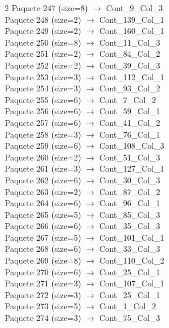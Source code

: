 \begin{multicols}{2}
Paquete 247 (size=8) $\rightarrow$ Cont\_9\_Col\_3\\
Paquete 248 (size=2) $\rightarrow$ Cont\_139\_Col\_1\\
Paquete 249 (size=2) $\rightarrow$ Cont\_160\_Col\_1\\
Paquete 250 (size=8) $\rightarrow$ Cont\_11\_Col\_3\\
Paquete 251 (size=2) $\rightarrow$ Cont\_84\_Col\_2\\
Paquete 252 (size=2) $\rightarrow$ Cont\_39\_Col\_3\\
Paquete 253 (size=3) $\rightarrow$ Cont\_112\_Col\_1\\
Paquete 254 (size=3) $\rightarrow$ Cont\_93\_Col\_2\\
Paquete 255 (size=6) $\rightarrow$ Cont\_7\_Col\_2\\
Paquete 256 (size=6) $\rightarrow$ Cont\_59\_Col\_1\\
Paquete 257 (size=6) $\rightarrow$ Cont\_41\_Col\_2\\
Paquete 258 (size=3) $\rightarrow$ Cont\_76\_Col\_1\\
Paquete 259 (size=6) $\rightarrow$ Cont\_108\_Col\_3\\
Paquete 260 (size=2) $\rightarrow$ Cont\_51\_Col\_3\\
Paquete 261 (size=3) $\rightarrow$ Cont\_127\_Col\_1\\
Paquete 262 (size=6) $\rightarrow$ Cont\_30\_Col\_3\\
Paquete 263 (size=2) $\rightarrow$ Cont\_87\_Col\_2\\
Paquete 264 (size=6) $\rightarrow$ Cont\_96\_Col\_1\\
Paquete 265 (size=5) $\rightarrow$ Cont\_85\_Col\_3\\
Paquete 266 (size=6) $\rightarrow$ Cont\_35\_Col\_3\\
Paquete 267 (size=5) $\rightarrow$ Cont\_101\_Col\_1\\
Paquete 268 (size=6) $\rightarrow$ Cont\_33\_Col\_3\\
Paquete 269 (size=8) $\rightarrow$ Cont\_110\_Col\_2\\
Paquete 270 (size=6) $\rightarrow$ Cont\_25\_Col\_1\\
Paquete 271 (size=3) $\rightarrow$ Cont\_107\_Col\_1\\
Paquete 272 (size=3) $\rightarrow$ Cont\_25\_Col\_1\\
Paquete 273 (size=5) $\rightarrow$ Cont\_1\_Col\_2\\
Paquete 274 (size=3) $\rightarrow$ Cont\_75\_Col\_3\\

\end{multicols}
